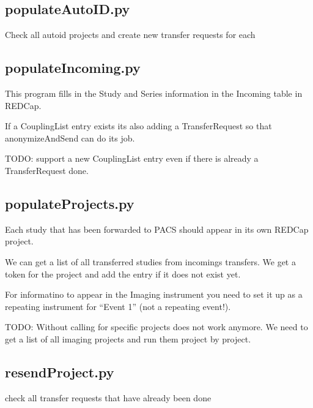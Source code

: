 \documentclass[letterpaper,10pt,english]{sphinxmanual}
\begin{document}
\subsection{populateAutoID.py}
\label{\detokenize{Architecture/scripts/populateAutoID:populateautoid-py}}\label{\detokenize{Architecture/scripts/populateAutoID::doc}}
\sphinxAtStartPar
Check all auto\sphinxhyphen{}id projects and create new transfer requests for each

\sphinxstepscope


\subsection{populateIncoming.py}
\label{\detokenize{Architecture/scripts/populateIncoming:populateincoming-py}}\label{\detokenize{Architecture/scripts/populateIncoming::doc}}
\sphinxAtStartPar
This program fills in the Study and Series information in the Incoming table in REDCap.

\sphinxAtStartPar
If a CouplingList entry exists its also adding a TransferRequest so that anonymizeAndSend can do its job.

\sphinxAtStartPar
TODO: support a new CouplingList entry even if there is already a TransferRequest done.

\sphinxstepscope


\subsection{populateProjects.py}
\label{\detokenize{Architecture/scripts/populateProjects:populateprojects-py}}\label{\detokenize{Architecture/scripts/populateProjects::doc}}
\sphinxAtStartPar
Each study that has been forwarded to PACS should appear in its own REDCap project.

\sphinxAtStartPar
We can get a list of all transferred studies from incomings transfers. We get a token for the project and add the entry \sphinxhyphen{} if it does not exist yet.

\sphinxAtStartPar
For informatino to appear in the Imaging instrument you need to set it up as a repeating instrument for “Event 1” (not a repeating event!).

\sphinxAtStartPar
TODO: Without calling for specific projects does not work anymore. We need to get a list of all imaging projects and run them project by project.

\sphinxstepscope


\subsection{resendProject.py}
\label{\detokenize{Architecture/scripts/resendProject:resendproject-py}}\label{\detokenize{Architecture/scripts/resendProject::doc}}
\sphinxAtStartPar
check all transfer requests that have already been done
\end{document}
